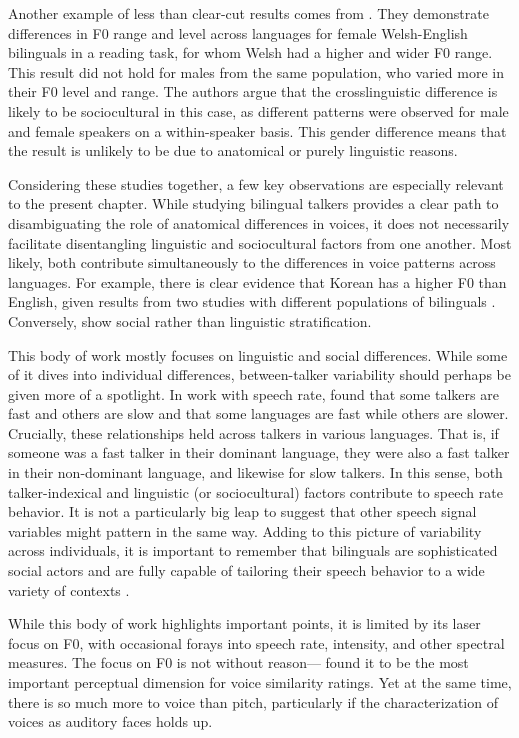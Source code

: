 Another example of less than clear-cut results comes from \citet{ordin_2017_cross}. They demonstrate differences in F0 range and level across languages for female Welsh-English bilinguals in a reading task, for whom Welsh had a higher and wider F0 range. This result did not hold for males from the same population, who varied more in their F0 level and range. The authors argue that the crosslinguistic difference is likely to be sociocultural in this case, as different patterns were observed for male and female speakers on a within-speaker basis. This gender difference means that the result is unlikely to be due to anatomical or purely linguistic reasons.

Considering these studies together, a few key observations are especially relevant to the present chapter. While studying bilingual talkers provides a clear path to disambiguating the role of anatomical differences in voices, it does not necessarily facilitate disentangling linguistic and sociocultural factors from one another. Most likely, both contribute simultaneously to the differences in voice patterns across languages. For example, there is clear evidence that Korean has a higher F0 than English, given results from two studies with different populations of bilinguals \cite{cheng_2020_f0,lee_2017_bilingual}. Conversely, \cite{ordin_2017_cross} show social rather than linguistic stratification. 

This body of work mostly focuses on linguistic and social differences. While some of it dives into individual differences, between-talker variability should perhaps be given more of a spotlight. In work with speech rate, \citet{bradlow_2017_rate} found that some talkers are fast and others are slow and that some languages are fast while others are slower. Crucially, these relationships held across talkers in various languages. That is, if someone was a fast talker in their dominant language, they were also a fast talker in their non-dominant language, and likewise for slow talkers. In this sense, both talker-indexical and linguistic (or sociocultural) factors contribute to speech rate behavior. It is not a particularly big leap to suggest that other speech signal variables might pattern in the same way. Adding to this picture of variability across individuals, it is important to remember that bilinguals are sophisticated social actors and are fully capable of tailoring their speech behavior to a wide variety of contexts \citep{bullock_2009_sociophonetics}. 

While this body of work highlights important points, it is limited by its laser focus on F0, with occasional forays into speech rate, intensity, and other spectral measures. The focus on F0 is not without reason---\citet{perrachione_2019_judgments} found it to be the most important perceptual dimension for voice similarity ratings. Yet at the same time, there is so much more to voice than pitch, particularly if the characterization of voices as auditory faces holds up. 

